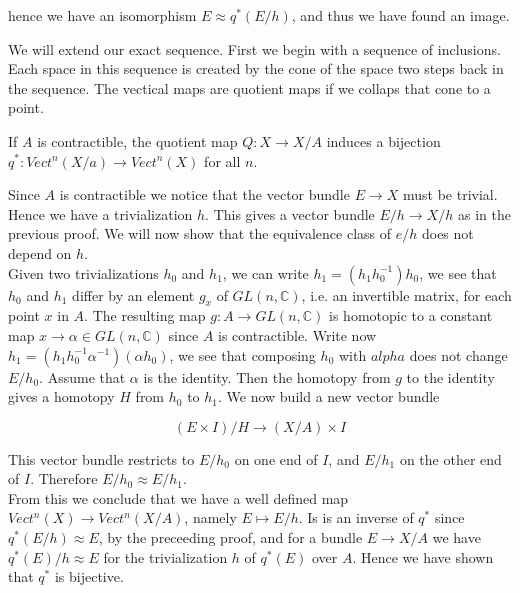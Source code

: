 \documentclass[../Thesis.tex]{subfiles}
\begin{document}
\begin{myproof}
hence we have an isomorphism $E \approx q^*(E/h)$, and thus we have found an image.
\end{myproof}
We will extend our exact sequence. First we begin with a sequence of inclusions. Each space in this sequence is created by the cone of the space two steps back in the sequence. The vectical maps are quotient maps if we collaps that cone to a point.
 \\    
\begin{Cor}
If $A$ is contractible, the quotient map $Q : X \rightarrow X/A$ induces a bijection $q^* : Vect^n(X/a) \rightarrow Vect^n(X)$ for all $n$.
\end{Cor}
\begin{myproof}
Since $A$ is contractible we notice that the vector bundle $E \rightarrow X$ must be trivial. Hence we have a trivialization $h$. This gives a vector bundle $E/h \rightarrow X/h$ as in the previous proof. We will now show that the equivalence class of $e/h$ does not depend on $h$.
\\Given two trivializations $h_0$ and $h_1$, we can write $h_1 =  (h_1h_0^{-1})h_0$, we see that $h_0$ and $h_1$ differ by an element $g_x$ of $GL(n, \mathbb{C})$, i.e. an invertible matrix, for each point $x$ in $A$. The resulting map $g : A \rightarrow GL(n, \mathbb{C})$ is homotopic to a constant map $x \rightarrow \alpha \in GL(n, \mathbb{C})$ since $A$ is contractible. Write now $h_1 = (h_1h_0^{-1}\alpha^{-1})(\alpha h_0)$, we see that composing $h_0$ with $alpha$ does not change $E/h_0$. Assume that $\alpha$ is the identity. 
Then the homotopy from $g$ to the identity gives a homotopy $H$ from $h_0$ to $h_1$. We now build a new vector bundle

\begin{equation}
(E \times I)/H \rightarrow (X/A) \times I
\end{equation}

This vector bundle restricts to $E/h_0$ on one end of $I$, and $E/h_1$ on the other end of $I$. Therefore $E/h_0 \approx E/h_1$.
\\From this we conclude that we have a well defined map $Vect^n(X) \rightarrow Vect^n(X/A)$, namely $E \mapsto E/h$. Is is an inverse of $q^*$ since $q^*(E/h) \approx E$, by the preceeding proof, and for a bundle $E \rightarrow X/A$ we have $q^*(E)/h \approx E$ for the trivialization $h$ of $q^*(E)$ over $A$. Hence we have shown that $q^*$ is bijective.
\end{myproof}
\end{document}
